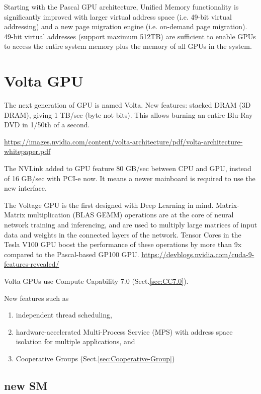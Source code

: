 Starting with the Pascal GPU architecture, Unified Memory functionality is
significantly improved with larger virtual address space (i.e. 49-bit virtual
addressing) and a new page migration engine (i.e. on-demand page migration).
49-bit virtual addresses (support maximum 512TB) are sufficient to enable GPUs
to access the entire system memory plus the memory of all GPUs in the system.

 

\chapter{Volta GPU}
\label{sec:GPU-Volta}

The next generation of GPU is named Volta. New features: stacked DRAM (3D DRAM),
giving 1 TB/sec (byte not bits). This allows burning an entire Blu-Ray DVD in
1/50th of a second.

\url{https://images.nvidia.com/content/volta-architecture/pdf/volta-architecture-whitepaper.pdf}

The NVLink added to GPU feature 80 GB/sec between CPU and GPU, instead of 16
GB/sec with PCI-e now. It means a newer mainboard is required to use the new
interface.

The Voltage GPU is the first designed with Deep Learning in mind.
Matrix-Matrix multiplication (BLAS GEMM) operations are at the core of neural
network training and inferencing, and are used to multiply large matrices of
input data and weights in the connected layers of the network. Tensor Cores in
the Tesla V100 GPU boost the performance of these operations by more than 9x
compared to the Pascal-based GP100 GPU.
\url{https://devblogs.nvidia.com/cuda-9-features-revealed/}

Volta GPUs use Compute Capability 7.0 (Sect.\ref{sec:CC7.0}).

New features such as 
\begin{enumerate}
  \item  independent thread scheduling, 
  
  \item hardware-accelerated Multi-Process Service (MPS) with address space
  isolation for multiple applications, and 
  
  \item Cooperative Groups (Sect.\ref{sec:Cooperative-Group})
  
\end{enumerate}

\section{new SM}
\label{sec:SM-Volta}

